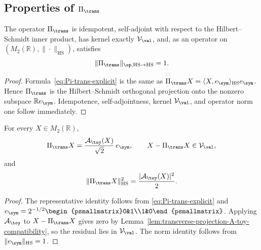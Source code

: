 \subsection{Properties of \(\Pi_\trans\)}
\label{subsec:transverse-projection-properties}

\begin{lemma}
\label{lem:transverse-projection-properties}
The operator \(\Pi_\trans\) is idempotent, self-adjoint with respect to
the Hilbert--Schmidt inner product, has kernel exactly
\(\mathcal V_\val\), and, as an operator on
\((M_2(\mathbb R),\|\cdot\|_{\mathrm{HS}})\), satisfies
\begin{equation}
\label{eq:Pi-trans-norm}
        \|\Pi_\trans\|_{\op,\mathrm{HS}\to\mathrm{HS}}=1.
\end{equation}
\end{lemma}

\begin{proof}
Formula~\eqref{eq:Pi-trans-explicit} is the same as
\(\Pi_\trans X=\langle X,e_\sym\rangle_{\mathrm{HS}}e_\sym\).  Hence
\(\Pi_\trans\) is the Hilbert--Schmidt orthogonal projection onto the
nonzero subspace \(\mathbb R e_\sym\).  Idempotence, self-adjointness,
kernel \(\mathcal V_\val\), and operator norm one follow immediately.
\end{proof}

\begin{lemma}
\label{lem:transverse-projection-quotient-representative}
For every \(X\in M_2(\mathbb R)\),
\begin{equation}
\label{eq:Pi-trans-representative}
        \Pi_\trans X=\frac{\mathcal A_\toy(X)}{\sqrt2}\,e_\sym,
        \qquad X-\Pi_\trans X\in\mathcal V_\val,
\end{equation}
and
\begin{equation}
\label{eq:Pi-trans-HS-norm-scalar}
        \|\Pi_\trans X\|_{\mathrm{HS}}^2
        =\frac{|\mathcal A_\toy(X)|^2}{2}.
\end{equation}
\end{lemma}

\begin{proof}
The representative identity follows from \eqref{eq:Pi-trans-explicit} and
\(e_\sym=2^{-1/2}\begin{psmallmatrix}0&1\\1&0\end{psmallmatrix}\).  Applying
\(\mathcal A_\toy\) to \(X-\Pi_\trans X\) gives zero by
Lemma~\ref{lem:transverse-projection-A-toy-compatibility}, so the residual
lies in \(\mathcal V_\val\).  The norm identity follows from
\(\|e_\sym\|_{\mathrm{HS}}=1\).
\end{proof}

